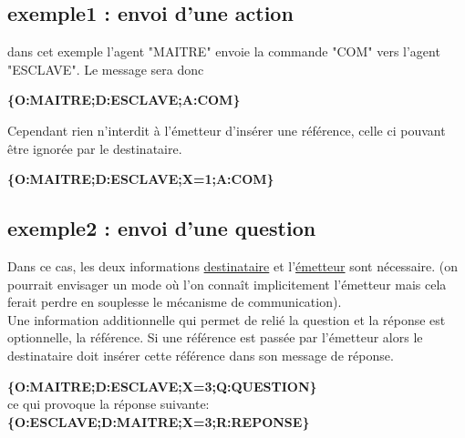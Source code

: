\documentclass[french]{article}
\begin{document}
\subsection{exemple1 : envoi d'une action}
dans cet exemple l'agent "MAITRE" envoie la commande "COM" vers l'agent "ESCLAVE". Le message sera donc\\
\begin{center}
\textbf{\{O:MAITRE;D:ESCLAVE;A:COM\}}
\end{center}
Cependant rien n'interdit à l'émetteur d'insérer une référence, celle ci pouvant être ignorée par le destinataire.
\begin{center}
	\textbf{\{O:MAITRE;D:ESCLAVE;X=1;A:COM\}}
\end{center}
\subsection{exemple2 : envoi d'une question}
Dans ce cas, les deux informations \underline{destinataire} et l’\underline{émetteur} sont nécessaire. (on pourrait envisager un mode où l’on connaît implicitement l’émetteur mais cela ferait perdre en souplesse
le mécanisme de communication).\\
Une information additionnelle qui permet de relié la question et la réponse est optionnelle, la référence. Si une référence est passée par l’émetteur alors le destinataire doit insérer cette
référence dans son message de réponse.
\begin{center}
	\textbf{\{O:MAITRE;D:ESCLAVE;X=3;Q:QUESTION\}}\\
	ce qui provoque la réponse suivante:\\
	\textbf{\{O:ESCLAVE;D:MAITRE;X=3;R:REPONSE\}}
\end{center}
\end{document}
